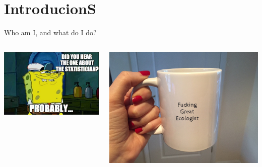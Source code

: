 \documentclass[
  ignorenonframetext,
]{beamer}
\newcommand{\columnsbegin}{\begin{columns}}
\newcommand{\columnsend}{\end{columns}}
\begin{document}
\hypertarget{introducions}{%
\section{IntroducionS}\label{introducions}}

\begin{frame}{Who am I, and what do I do?}
\protect\hypertarget{who-am-i-and-what-do-i-do}{}
\columnsbegin
{}

\includegraphics{statistician.jpg}


\includegraphics{ecologist2.jpg}

\columnsend
\end{frame}
\end{document}
